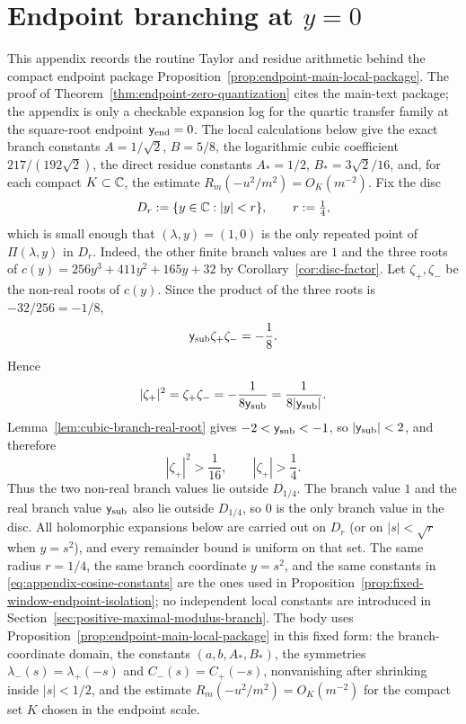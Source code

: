 \section{Endpoint branching at \texorpdfstring{\(y=0\)}{y=0}}\label{app:endpoint-branching}

This appendix records the routine Taylor and residue arithmetic behind the compact endpoint package Proposition~\ref{prop:endpoint-main-local-package}.
The proof of Theorem~\ref{thm:endpoint-zero-quantization} cites the main-text package; the appendix is only a checkable expansion log for the quartic transfer family at the square-root endpoint $\mathsf{y}_{\mathrm{end}}=0$.
The local calculations below give the exact branch constants \(A=1/\sqrt2\), \(B=5/8\), the logarithmic cubic coefficient \(217/(192\sqrt2)\), the direct residue constants \(A_*=1/2\), \(B_*=3\sqrt2/16\), and, for each compact \(K\subset\mathbb{C}\), the estimate \(R_m(-u^2/m^2)=O_K(m^{-2})\).
Fix the disc
\[
D_r:=\{y\in\mathbb{C}:\left\lvert y\right\rvert<r\},\qquad r:=\tfrac14,
\]
which is small enough that $(\lambda,y)=(1,0)$ is the only repeated point of $\Pi(\lambda,y)$ in $D_r$.
Indeed, the other finite branch values are $1$ and the three roots of $c(y)=256y^3+411y^2+165y+32$ by Corollary~\ref{cor:disc-factor}.
Let $\zeta_{+},\zeta_{-}$ be the non-real roots of $c(y)$.
Since the product of the three roots is $-32/256=-1/8$,
\[
\mathsf{y}_{\mathrm{sub}}\zeta_{+}\zeta_{-}=-\frac18.
\]
Hence
\[
|\zeta_{+}|^2=\zeta_{+}\zeta_{-}=-\frac{1}{8\mathsf{y}_{\mathrm{sub}}}
=\frac{1}{8|\mathsf{y}_{\mathrm{sub}}|}.
\]
Lemma~\ref{lem:cubic-branch-real-root} gives $-2<\mathsf{y}_{\mathrm{sub}}<-1$, so $|\mathsf{y}_{\mathrm{sub}}|<2$, and therefore
\[
|\zeta_{+}|^2>\frac1{16},
\qquad
|\zeta_{+}|>\frac14.
\]
Thus the two non-real branch values lie outside $D_{1/4}$.
The branch value $1$ and the real branch value $\mathsf{y}_{\mathrm{sub}}$ also lie outside $D_{1/4}$, so $0$ is the only branch value in the disc.
All holomorphic expansions below are carried out on $D_r$ (or on $|s|<\sqrt{r}$ when $y=s^2$), and every remainder bound is uniform on that set.
The same radius $r=1/4$, the same branch coordinate $y=s^2$, and the same constants in \eqref{eq:appendix-cosine-constants} are the ones used in Proposition~\ref{prop:fixed-window-endpoint-isolation}; no independent local constants are introduced in Section~\ref{sec:positive-maximal-modulus-branch}.
The body uses Proposition~\ref{prop:endpoint-main-local-package} in this fixed form: the branch-coordinate domain, the constants \((a,b,A_*,B_*)\), the symmetries \(\lambda_-(s)=\lambda_+(-s)\) and \(C_-(s)=C_+(-s)\), nonvanishing after shrinking inside \(|s|<1/2\), and the estimate \(R_m(-u^2/m^2)=O_K(m^{-2})\) for the compact set \(K\) chosen in the endpoint scale.
